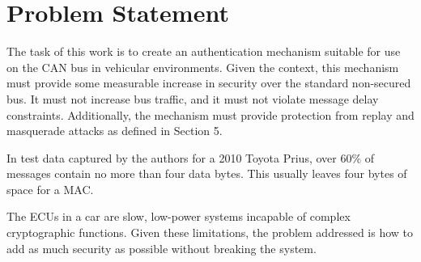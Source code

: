 \section{Problem Statement}

The task of this work is to create an authentication mechanism suitable for use on the CAN bus in vehicular environments. Given the context, this mechanism must provide some measurable increase in security over the standard non-secured bus. It must not increase bus traffic, and it must not violate message delay constraints. Additionally, the mechanism must provide protection from replay and masquerade attacks as defined in Section 5.

In test data captured by the authors for a 2010 Toyota Prius, over 60\% of messages contain no more than four data bytes. This usually leaves four bytes of space for a MAC.

The ECUs in a car are slow, low-power systems incapable of complex cryptographic functions. Given these limitations, the problem addressed is how to add as much security as possible without breaking the system.
